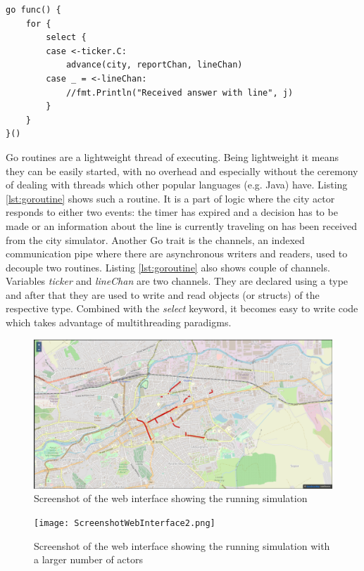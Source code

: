 \documentclass[conference]{IEEEtran}
\begin{document}
\begin{lstlisting}[caption=Go routine from city actor, label=lst:goroutine]
go func() {
	for {
		select {
		case <-ticker.C:
			advance(city, reportChan, lineChan)
		case _ = <-lineChan:
			//fmt.Println("Received answer with line", j)
		}
	}
}()
\end{lstlisting}

Go routines are a lightweight thread of executing. Being lightweight it means they can be easily started, with no overhead and especially without the ceremony of dealing with threads which other popular languages (e.g. Java) have. Listing \ref{lst:goroutine} shows such a routine. It is a part of logic where the city actor responds to either two events: the timer has expired and a decision has to be made or an information about the line is currently traveling on has been received from the city simulator. Another Go trait is the channels, an indexed communication pipe where there are asynchronous writers and readers, used to decouple two routines. Listing \ref{lst:goroutine} also shows couple of channels. Variables \textit{ticker} and \textit{lineChan} are two channels. They are declared using a type and after that they are used to write and read objects (or structs) of the respective type. Combined with the \textit{select} keyword, it becomes easy to write code which takes advantage of multithreading paradigms.

\begin{figure}
  \includegraphics[width=0.9\linewidth]{ScreenshotWebInterface.png}
  \centering
  \caption{Screenshot of the web interface showing the running simulation}
  \label{fig:ScreenshotWebInterface}
\end{figure}

\begin{figure}
  \texttt{[image: ScreenshotWebInterface2.png]}
  \centering
  \caption{Screenshot of the web interface showing the running simulation with a larger number of actors}
  \label{fig:ScreenshotWebInterface2}
\end{figure}
\end{document}

